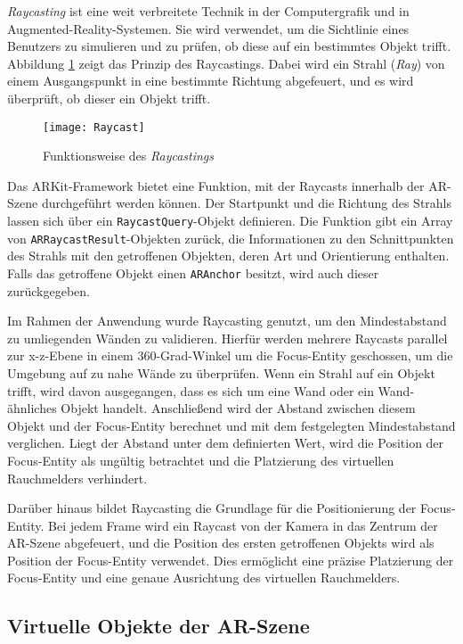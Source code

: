 \textit{Raycasting} ist eine weit verbreitete Technik in der Computergrafik und in Augmented-Reality-Systemen. Sie wird verwendet, um die Sichtlinie eines Benutzers zu simulieren und zu prüfen, ob diese auf ein bestimmtes Objekt trifft. Abbildung \ref{fig:Raycasting} zeigt das Prinzip des Raycastings. Dabei wird ein Strahl (\textit{Ray}) von einem Ausgangspunkt in eine bestimmte Richtung abgefeuert, und es wird überprüft, ob dieser ein Objekt trifft.

\begin{figure}[ht]
    \centering
    \texttt{[image: Raycast]}
    \caption{Funktionsweise des \textit{Raycastings}}
    \label{fig:Raycasting}
\end{figure}

Das ARKit-Framework bietet eine Funktion, mit der Raycasts innerhalb der AR-Szene durchgeführt werden können. Der Startpunkt und die Richtung des Strahls lassen sich über ein \texttt{RaycastQuery}-Objekt definieren. Die Funktion gibt ein Array von \texttt{ARRaycastResult}-Objekten zurück, die Informationen zu den Schnittpunkten des Strahls mit den getroffenen Objekten, deren Art und Orientierung enthalten. Falls das getroffene Objekt einen \texttt{ARAnchor} besitzt, wird auch dieser zurückgegeben.

Im Rahmen der Anwendung wurde Raycasting genutzt, um den Mindestabstand zu umliegenden Wänden zu validieren. Hierfür werden mehrere Raycasts parallel zur x-z-Ebene in einem 360-Grad-Winkel um die Focus-Entity geschossen, um die Umgebung auf zu nahe Wände zu überprüfen. Wenn ein Strahl auf ein Objekt trifft, wird davon ausgegangen, dass es sich um eine Wand oder ein Wand-ähnliches Objekt handelt. Anschließend wird der Abstand zwischen diesem Objekt und der Focus-Entity berechnet und mit dem festgelegten Mindestabstand verglichen. Liegt der Abstand unter dem definierten Wert, wird die Position der Focus-Entity als ungültig betrachtet und die Platzierung des virtuellen Rauchmelders verhindert.

Darüber hinaus bildet Raycasting die Grundlage für die Positionierung der Focus-Entity. Bei jedem Frame wird ein Raycast von der Kamera in das Zentrum der AR-Szene abgefeuert, und die Position des ersten getroffenen Objekts wird als Position der Focus-Entity verwendet. Dies ermöglicht eine präzise Platzierung der Focus-Entity und eine genaue Ausrichtung des virtuellen Rauchmelders.

\subsection{Virtuelle Objekte der AR-Szene}

